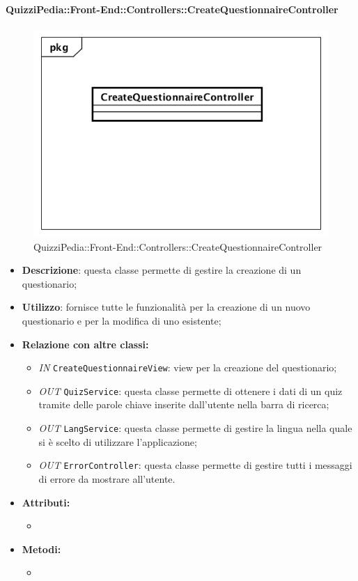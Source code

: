 \paragraph{QuizziPedia::Front-End::Controllers::CreateQuestionnaireController}
\begin{figure}
	\centering
	\includegraphics[scale=0.45]{UML/Classi/Front-End/QuizziPedia_Front-end_Controller_CreateQuestionnaireController.png}
	\caption{QuizziPedia::Front-End::Controllers::CreateQuestionnaireController}
\end{figure}
\begin{itemize}
	\item \textbf{Descrizione}: questa classe permette di gestire la creazione di un questionario;
	\item \textbf{Utilizzo}: fornisce tutte le funzionalità per la creazione di un nuovo questionario e per la modifica di uno esistente;
	\item \textbf{Relazione con altre classi:}
	\begin{itemize}
		\item \textit{IN} \texttt{CreateQuestionnaireView}: view per la creazione del questionario; 
		\item \textit{OUT} \texttt{QuizService}: questa classe permette di ottenere i dati di un quiz tramite delle parole chiave inserite dall'utente nella barra di ricerca;
		\item \textit{OUT} \texttt{LangService}: questa classe permette di gestire la lingua nella quale si è scelto di utilizzare l'applicazione;
		\item \textit{OUT} \texttt{ErrorController}: questa classe permette di gestire tutti i messaggi di errore da mostrare all'utente.
	\end{itemize}
	\item \textbf{Attributi:}
	\begin{itemize}
		\item 
	\end{itemize}
	\item \textbf{Metodi:}
	\begin{itemize}
		\item 
	\end{itemize}
\end{itemize}

